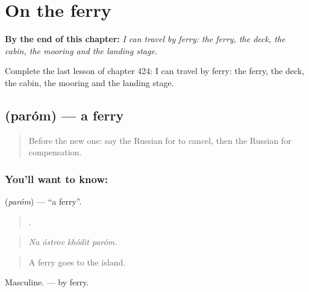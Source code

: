 
\chapter{On the ferry}
\label{ch:ru-on-the-ferry}

\begin{chapteropening}
\textbf{By the end of this chapter:} \emph{I can travel by ferry: the ferry, the deck, the cabin, the mooring and the landing stage.}

Complete the last lesson of chapter 424: I can travel by ferry: the ferry, the deck, the cabin, the mooring and the landing stage.
\end{chapteropening}

\section[\texorpdfstring{\ru{паром} (paróm)}{паром (paróm)}]{ (paróm) — a ferry}

\label{lesson:RU-C424-parom}



\begin{quote}
Before the new one: say the Russian for to cancel, then the Russian for compensation.
\end{quote}

\subsection*{You'll want to know: }
\textbf{} (\emph{paróm}) — \textquotedblleft{}a ferry\textquotedblright{}.

\begin{quote}
   .
\end{quote}

\begin{quote}
\emph{Na óstrov khódit paróm.}
\end{quote}

\begin{quote}
A ferry goes to the island.
\end{quote}

Masculine. \emph{ } — by ferry.


